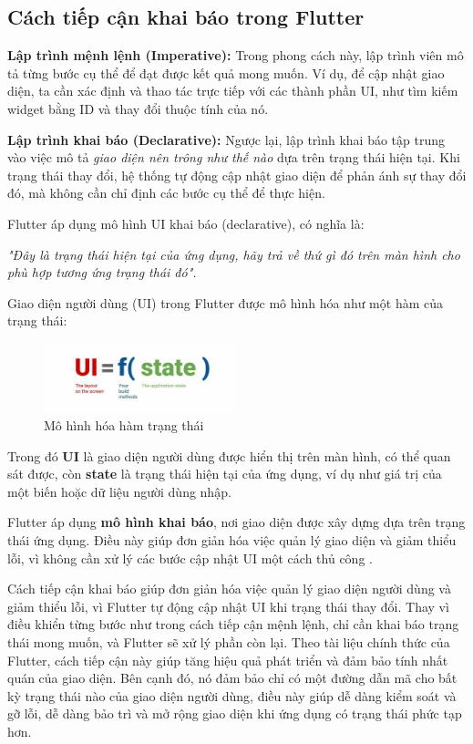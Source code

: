 \documentclass[../DoAn.tex]{subfiles}
\numberwithin{figure}{chapter}
\begin{document}
\subsection{Cách tiếp cận khai báo trong Flutter}

\textbf{Lập trình mệnh lệnh (Imperative):} Trong phong cách này, lập trình viên mô tả từng bước cụ thể để đạt được kết quả mong muốn. Ví dụ, để cập nhật giao diện, ta cần xác định và thao tác trực tiếp với các thành phần UI, như tìm kiếm widget bằng ID và thay đổi thuộc tính của nó.

\textbf{Lập trình khai báo (Declarative):} Ngược lại, lập trình khai báo tập trung vào việc mô tả \textit{giao diện nên trông như thế nào} dựa trên trạng thái hiện tại. Khi trạng thái thay đổi, hệ thống tự động cập nhật giao diện để phản ánh sự thay đổi đó, mà không cần chỉ định các bước cụ thể để thực hiện.

Flutter áp dụng mô hình UI khai báo (declarative), có nghĩa là:

\textit{
"Đây là trạng thái hiện tại của ứng dụng, hãy trả về thứ gì đó trên màn hình cho phù hợp tương ứng trạng thái đó".
}

Giao diện người dùng (UI) trong Flutter được mô hình hóa như một hàm của trạng thái:
\begin{figure}[H]
    \centering
    \includegraphics[width=0.5\textwidth]{Hinhve/Chuong5/flutterState.jpg}
    \caption{Mô hình hóa hàm trạng thái}
    \label{fig:flutterstate}
\end{figure}
Trong đó \textbf{UI} là giao diện người dùng được hiển thị trên màn hình, có thể quan sát được, còn \textbf{state} là trạng thái hiện tại của ứng dụng, ví dụ như giá trị của một biến hoặc dữ liệu người dùng nhập.

Flutter áp dụng \textbf{mô hình khai báo}, nơi giao diện được xây dựng dựa trên trạng thái ứng dụng. Điều này giúp đơn giản hóa việc quản lý giao diện và giảm thiểu lỗi, vì không cần xử lý các bước cập nhật UI một cách thủ công .

Cách tiếp cận khai báo giúp đơn giản hóa việc quản lý giao diện người dùng và giảm thiểu lỗi, vì Flutter tự động cập nhật UI khi trạng thái thay đổi. Thay vì điều khiển từng bước như trong cách tiếp cận mệnh lệnh, chỉ cần khai báo trạng thái mong muốn, và Flutter sẽ xử lý phần còn lại. Theo tài liệu chính thức của Flutter, cách tiếp cận này giúp tăng hiệu quả phát triển và đảm bảo tính nhất quán của giao diện. Bên cạnh đó, nó đảm bảo chỉ có một đường dẫn mã cho bất kỳ trạng thái nào của giao diện người dùng, điều này giúp dễ dàng kiểm soát và gỡ lỗi, dễ dàng bảo trì và mở rộng giao diện khi ứng dụng có trạng thái phức tạp hơn.
\end{document}

